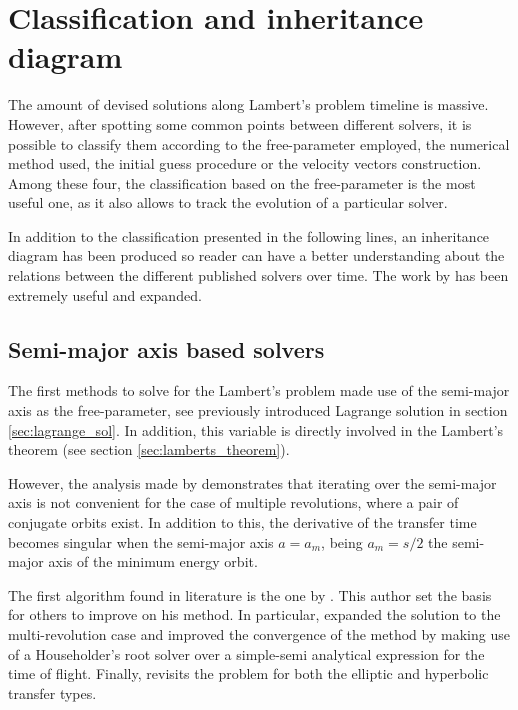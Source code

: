 \section{Classification and inheritance diagram}
\label{sec:classification}

The amount of devised solutions along Lambert's problem timeline is massive.
However, after spotting some common points between different solvers, it is
possible to classify them according to the free-parameter employed, the
numerical method used, the initial guess procedure or the velocity vectors
construction. Among these four, the classification based on the free-parameter
is the most useful one, as it also allows to track the evolution of a particular
solver.

In addition to the classification presented in the following lines, an
inheritance diagram has been produced so reader can have a better understanding
about the relations between the different published solvers over time. The work
by \cite{sangra2020} has been extremely useful and expanded.

\subsection{Semi-major axis based solvers}

The first methods to solve for the Lambert's problem made use of the semi-major
axis as the free-parameter, see previously introduced Lagrange solution in
section \ref{sec:lagrange_sol}. In addition, this variable is directly involved
in the Lambert's theorem (see section \ref{sec:lamberts_theorem}).

However, the analysis made by \cite{battin1999} demonstrates that iterating over
the semi-major axis is not convenient for the case of multiple revolutions,
where a pair of conjugate orbits exist. In addition to this, the derivative of
the transfer time becomes singular when the semi-major axis $a = a_m$, being
$a_m = s / 2$ the semi-major axis of the minimum energy orbit.

The first algorithm found in literature is the one by \cite{lagrange1788}. This
author set the basis for others to improve on his method. In particular,
\cite{prussing2000} expanded the solution to the multi-revolution case and
\cite{wailliez2014} improved the convergence of the method by making use of a
Householder's root solver over a simple-semi analytical expression for the time
of flight. Finally, \cite{jiang2016} revisits the problem for both the elliptic
and hyperbolic transfer types.

